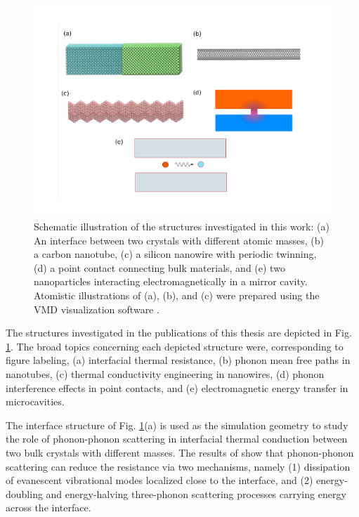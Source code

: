\begin{figure}
\begin{center}
 \includegraphics[width=1\columnwidth]{inkscape/systems.pdf} 
 \caption{Schematic illustration of the structures investigated in this work: (a) An interface between two crystals with different atomic masses, (b) a carbon nanotube, (c) a silicon nanowire with periodic twinning, (d) a point contact connecting bulk materials, and (e) two nanoparticles interacting electromagnetically in a mirror cavity. Atomistic illustrations of (a), (b), and (c) were prepared using the VMD visualization software \cite{humphrey96}.}
\label{fig:intro_structures}
\end{center}
\end{figure}

The structures investigated in the publications of this thesis are depicted in Fig. \ref{fig:intro_structures}. The broad topics concerning each depicted structure were, corresponding to figure labeling, (a) interfacial thermal resistance, (b) phonon mean free paths in nanotubes, (c) thermal conductivity engineering in nanowires, (d) phonon interference effects in point contacts, and (e) electromagnetic energy transfer in microcavities. 

The interface structure of Fig. \ref{fig:intro_structures}(a) is used as the simulation geometry to study the role of phonon-phonon scattering in interfacial thermal conduction between two bulk crystals with different masses. The results of  show that phonon-phonon scattering can reduce the resistance via two mechanisms, namely (1) dissipation of evanescent vibrational modes localized close to the interface, and (2) energy-doubling and energy-halving three-phonon scattering processes carrying energy across the interface.  

